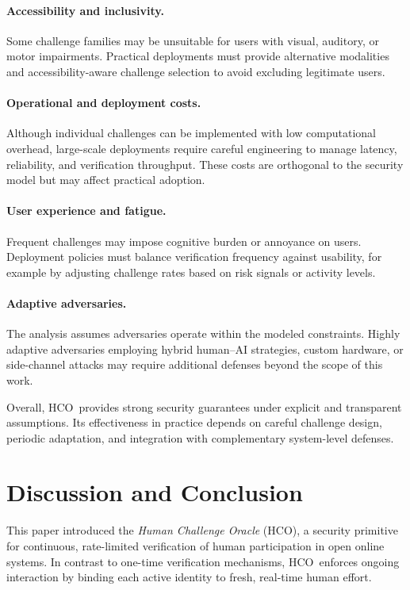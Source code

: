 \documentclass[11pt]{article}
\newcommand{\HCO}{HCO\xspace}
\begin{document}
\paragraph{Accessibility and inclusivity.}
Some challenge families may be unsuitable for users with visual, auditory, or motor impairments. Practical deployments must provide alternative modalities and accessibility-aware challenge selection to avoid excluding legitimate users.

\paragraph{Operational and deployment costs.}
Although individual challenges can be implemented with low computational overhead, large-scale deployments require careful engineering to manage latency, reliability, and verification throughput. These costs are orthogonal to the security model but may affect practical adoption.

\paragraph{User experience and fatigue.}
Frequent challenges may impose cognitive burden or annoyance on users. Deployment policies must balance verification frequency against usability, for example by adjusting challenge rates based on risk signals or activity levels.

\paragraph{Adaptive adversaries.}
The analysis assumes adversaries operate within the modeled constraints. Highly adaptive adversaries employing hybrid human--AI strategies, custom hardware, or side-channel attacks may require additional defenses beyond the scope of this work.

\medskip
Overall, \HCO\ provides strong security guarantees under explicit and transparent assumptions. Its effectiveness in practice depends on careful challenge design, periodic adaptation, and integration with complementary system-level defenses.

	
\section{Discussion and Conclusion}

This paper introduced the \emph{Human Challenge Oracle} (\HCO), a security primitive for continuous, rate-limited verification of human participation in open online systems. In contrast to one-time verification mechanisms, \HCO\ enforces ongoing interaction by binding each active identity to fresh, real-time human effort.
\end{document}
